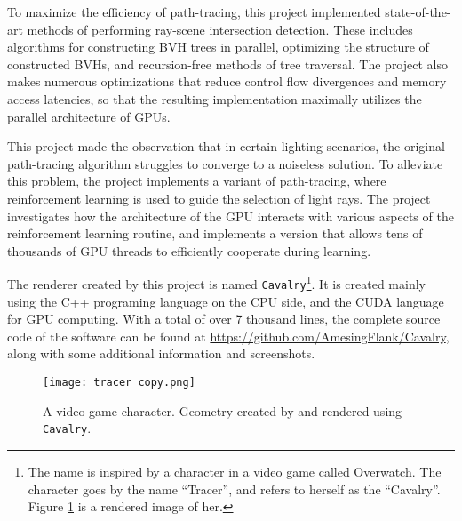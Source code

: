 To maximize the efficiency of path-tracing, this project implemented state-of-the-art methods of performing ray-scene intersection detection. These includes algorithms for constructing BVH trees in parallel, optimizing the structure of constructed BVHs, and recursion-free methods of tree traversal. The project also makes numerous optimizations that reduce control flow divergences and memory access latencies, so that the resulting implementation maximally utilizes the parallel architecture of GPUs.  

This project made the observation that in certain lighting scenarios, the original path-tracing algorithm struggles to converge to a noiseless solution. To alleviate this problem, the project implements a variant of path-tracing, where reinforcement learning is used to guide the selection of light rays. The project investigates how the architecture of the GPU interacts with various aspects of the reinforcement learning routine, and implements a version that allows tens of thousands of GPU threads to efficiently cooperate during learning. 


The renderer created by this project is named \texttt{Cavalry}\footnote{The name is inspired by a character in a video game called Overwatch. The character goes by the name ``Tracer'', and refers to herself as the ``Cavalry''. Figure \ref{figure tracer} is a rendered image of her.}. It is created mainly using the C++ programing language on the CPU side, and the CUDA language for GPU computing. With a total of over 7 thousand lines, the complete source code of the software can be found at \url{https://github.com/AmesingFlank/Cavalry}, along with some additional information and screenshots.

\begin{figure}[H]
    \centering
    \texttt{[image: tracer copy.png]}
    \caption{A video game character. Geometry created by \cite{tracer} and rendered using \texttt{Cavalry}.}
    \label{figure tracer}
\end{figure}